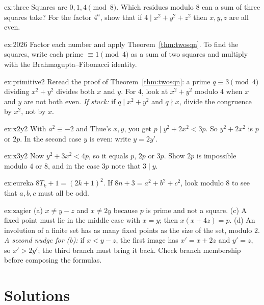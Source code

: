 \begin{hint}{ex:three}
Squares are $0,1,4\pmod8$. Which residues modulo $8$ can a sum of three squares take? For the factor $4^a$, show that if $4\mid x^2+y^2+z^2$ then $x,y,z$ are all even.
\end{hint}
\begin{hint}{ex:2026}
Factor each number and apply Theorem~\ref{thm:twosqn}. To find the squares, write each prime $\equiv1\pmod4$ as a sum of two squares and multiply with the Brahmagupta--Fibonacci identity.
\end{hint}
\begin{hint}{ex:primitive2}
Reread the proof of Theorem~\ref{thm:twosqn}: a prime $q\equiv3\pmod4$ dividing $x^2+y^2$ divides both $x$ and $y$. For $4$, look at $x^2+y^2$ modulo $4$ when $x$ and $y$ are not both even. \emph{If stuck:} if $q\mid x^2+y^2$ and $q\nmid x$, divide the congruence by $x^2$, not by $x$.
\end{hint}
\begin{hint}{ex:x2y2}
With $a^2\equiv-2$ and Thue's $x,y$, you get $p\mid y^2+2x^2<3p$. So $y^2+2x^2$ is $p$ or $2p$. In the second case $y$ is even: write $y=2y'$.
\end{hint}
\begin{hint}{ex:x3y2}
Now $y^2+3x^2<4p$, so it equals $p$, $2p$ or $3p$. Show $2p$ is impossible modulo $4$ or $8$, and in the case $3p$ note that $3\mid y$.
\end{hint}
\begin{hint}{ex:eureka}
$8T_k+1=(2k+1)^2$. If $8n+3=a^2+b^2+c^2$, look modulo $8$ to see that $a,b,c$ must all be odd.
\end{hint}
\begin{hint}{ex:zagier}
(a) $x\ne y-z$ and $x\ne2y$ because $p$ is prime and not a square. (c) A fixed point must lie in the middle case with $x=y$; then $x(x+4z)=p$. (d) An involution of a finite set has as many fixed points as the size of the set, modulo $2$. \emph{A second nudge for (b):} if $x<y-z$, the first image has $x'=x+2z$ and $y'=z$, so $x'>2y'$; the third branch must bring it back. Check branch membership before composing the formulas.
\end{hint}

\section{Solutions}

